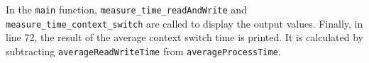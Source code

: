 \documentclass[10pt, answers]{exam}
\begin{document}
\begin{questions}
\begin{solution}
In the \texttt{main} function, \texttt{measure\_time\_readAndWrite} and \texttt{measure\_time\_context\_switch} are called to display the output values. Finally, in line 72, the result of the average context switch time is printed. It is calculated by subtracting \texttt{averageReadWriteTime} from \texttt{averageProcessTime}.




\end{solution}

\end{questions}
\end{document}
